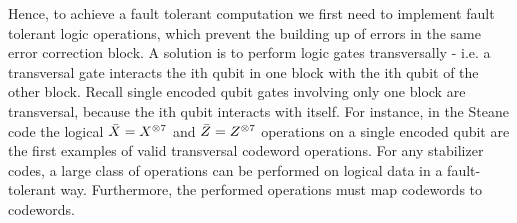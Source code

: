 Hence, to achieve a fault tolerant computation we first need to implement fault tolerant logic operations, which prevent the building up of errors in the same error correction block. A solution is to perform logic gates transversally - i.e. a transversal gate interacts the ith qubit in one block with the ith qubit of the other block. Recall single encoded qubit gates involving only one block are transversal, because the ith qubit interacts with itself.
For instance, in the Steane code the logical $\Bar{X}=X^{\otimes 7} $ and $\Bar{Z}=Z^{\otimes 7}$ operations on a single encoded
qubit are the first examples of valid transversal codeword operations.
For any stabilizer codes, a large class of operations can be performed on logical data in a fault-tolerant way. 
Furthermore, the performed operations must map codewords to codewords.



